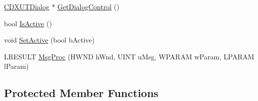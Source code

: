 \begin{DoxyCompactItemize}
\item 
\hyperlink{class_c_d_x_u_t_dialog}{CDXUTDialog} $\ast$ \hyperlink{class_c_d3_d_settings_dlg_a0c5cd502ae62c1460d989e2e51590ab4}{GetDialogControl} ()
\item 
bool \hyperlink{class_c_d3_d_settings_dlg_a1bf2d86e2af7d854ed904035e15677bd}{IsActive} ()
\item 
void \hyperlink{class_c_d3_d_settings_dlg_a78ee87995db6417e18e597610f119212}{SetActive} (bool bActive)
\item 
LRESULT \hyperlink{class_c_d3_d_settings_dlg_a8a3ecd505c89b0bba30aabce63534a31}{MsgProc} (HWND hWnd, UINT uMsg, WPARAM wParam, LPARAM lParam)
\end{DoxyCompactItemize}
\subsection*{Protected Member Functions}
